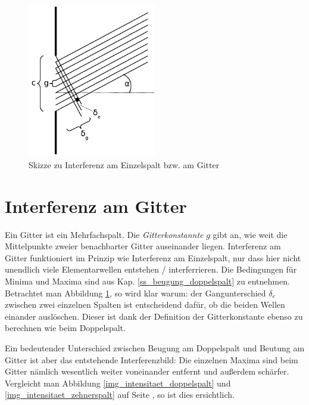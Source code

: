 \begin{figure}
   \centering
   \includegraphics[width=0.5\textwidth]{mat/beugung_mehrfachspalt}
   \caption{Skizze zu Interferenz am Einzelspalt bzw. am Gitter}
   \label{img_aufbau_beugung_mehrfachspalt}
\end{figure}







	\section{Interferenz am Gitter}


Ein Gitter ist ein Mehrfachspalt. Die \textit{Gitterkonstannte} \(g\) gibt an, wie weit die Mittelpunkte zweier benachbarter Gitter auseinander liegen. Interferenz am Gitter funktioniert im Prinzip wie Interferenz am Einzelspalt, nur dass hier nicht unendlich viele Elementarwellen entstehen / interferrieren. Die Bedingungen für Minima und Maxima sind aus Kap. \ref{ss_beugung_doppelspalt} zu entnehmen. Betrachtet man Abbildung \ref{img_aufbau_beugung_mehrfachspalt}, so wird klar warum: der Gangunterschied \(\delta_e\) zwischen zwei einzelnen Spalten ist entscheidend dafür, ob die beiden Wellen einander auslöschen. Dieser ist dank der Definition der Gitterkonstante ebenso zu berechnen wie beim Doppelspalt.


Ein bedeutender Unterschied zwischen Beugung am Doppelspalt und Beutung am Gitter ist aber das entstehende Interferenzbild: Die einzelnen Maxima sind beim Gitter nämlich wesentlich weiter voneinander entfernt und außerdem schärfer. Vergleicht man Abbildung \ref{img_intensitaet_doppelspalt} und \ref{img_intensitaet_zehnerspalt} auf Seite \pageref{img_intensitaet_doppelspalt}, so ist dies ersichtlich. 

